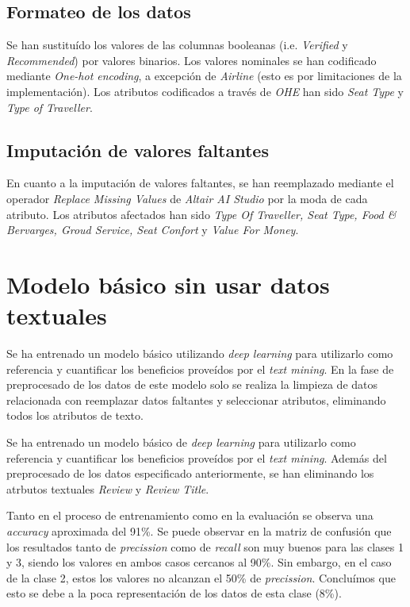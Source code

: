 \documentclass[12pt]{report} %
\begin{document}
\section{Formateo de los datos}
\label{sec:formateo}
Se han sustituído los valores de las columnas booleanas (i.e. \textit{Verified} y \textit{Recommended}) por valores binarios. Los valores nominales se han codificado mediante \textit{One-hot encoding}, a excepción de \textit{Airline} (esto es por limitaciones de la implementación). Los atributos codificados a través de \textit{OHE} han sido \textit{Seat Type} y \textit{Type of Traveller}.

\section{Imputación de valores faltantes}
\label{sec:imputacion}
En cuanto a la imputación de valores faltantes, se han reemplazado mediante el operador \textit{Replace Missing Values} de \textit{Altair AI Studio} por la moda de cada atributo. Los atributos afectados han sido \textit{Type Of Traveller, Seat Type, Food \& Bervarges, Groud Service, Seat Confort} y \textit{Value For Money}.

\chapter{Modelo básico sin usar datos textuales}
\label{chap:basicModel}
Se ha entrenado un modelo básico utilizando \textit{deep learning} para utilizarlo como referencia y cuantificar los beneficios proveídos por el \textit{text mining}. En la fase de preprocesado de los datos de este modelo solo se realiza la limpieza de datos relacionada con reemplazar datos faltantes y seleccionar atributos, eliminando todos los atributos de texto.

Se ha entrenado un modelo básico de \textit{deep learning} para utilizarlo como referencia y cuantificar los beneficios proveídos %
por el \textit{text mining}. Además del preprocesado de los datos especificado anteriormente, se han eliminando los atrbutos textuales \textit{Review} y \textit{Review Title}.

Tanto en el proceso de entrenamiento como en la evaluación se observa una \textit{accuracy} aproximada del 91\%. Se puede observar en la matriz de confusión que los resultados tanto de \textit{precission} como de \textit{recall} son muy buenos para las clases 1 y 3, siendo los valores en ambos casos cercanos al 90\%. Sin embargo, en el caso de la clase 2, estos los valores no alcanzan el 50\% de \textit{precission}. Concluímos que esto se debe a la poca representación de los datos de esta clase (8\%).
\end{document}
